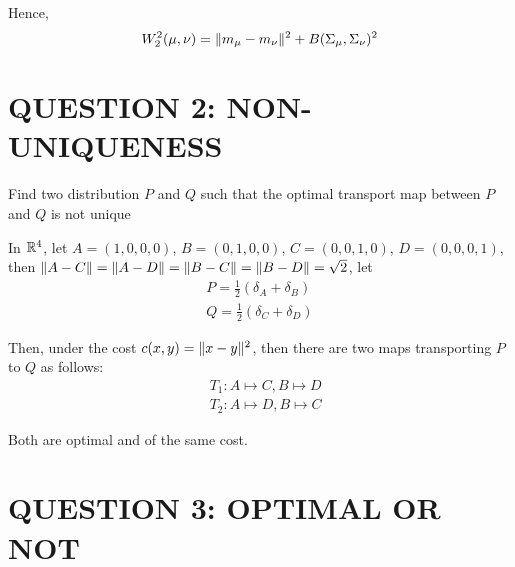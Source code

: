 Hence, 
$$
	W_2^2(\mu, \nu) = \lVert m_\mu - m_\nu\rVert^2 + B(\Sigma_\mu, \Sigma_\nu)^2
$$

\section{QUESTION 2: NON-UNIQUENESS	}

\begin{problem}
	Find two distribution $P$ and $Q$ such that the optimal transport map between $P$ and $Q$ is not unique
\end{problem}

In $\mathbb{R}^4$, let $A = (1, 0, 0, 0)$, $B = (0, 1, 0, 0)$, $C = (0, 0, 1, 0)$, $D = (0, 0, 0, 1)$, then $\lVert A - C\rVert = \lVert A - D\rVert = \lVert B - C\rVert = \lVert B - D\rVert = \sqrt{2}$, let
\begin{align*}
	P = \frac{1}{2}(\delta_A + \delta_B) \\
	Q = \frac{1}{2}(\delta_C + \delta_D)
\end{align*}

Then, under the cost $c(x, y) = \lVert x - y\rVert^2$, then there are two maps transporting $P$ to $Q$ as follows:
\begin{align*}
	&T_1: A \mapsto C, B \mapsto D \\
	&T_2: A \mapsto D, B \mapsto C
\end{align*}

Both are optimal and of the same cost.

\section{QUESTION 3: OPTIMAL OR NOT}


